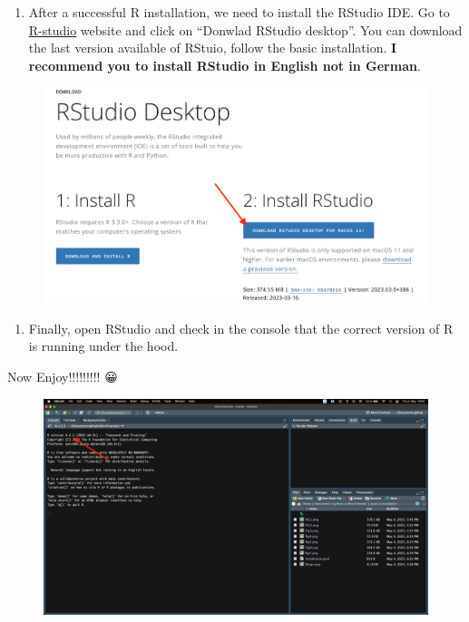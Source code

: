 \documentclass[
  letterpaper,
  DIV=11,
  numbers=noendperiod]{scrartcl}
\providecommand{\tightlist}{%
  \setlength{\itemsep}{0pt}\setlength{\parskip}{0pt}}\usepackage{longtable,booktabs,array}
\begin{document}
\begin{enumerate}
\def\labelenumi{\arabic{enumi}.}
\tightlist
\item
  After a successful R installation, we need to install the RStudio IDE.
  Go to \href{https://posit.co/download/rstudio-desktop/}{R-studio}
  website and click on ``Donwlad RStudio desktop''. You can download the
  last version available of RStuio, follow the basic installation.
  \textbf{I recommend you to install RStudio in English not in German}.
\end{enumerate}

\begin{figure}[H]

{\centering \includegraphics[width=6.77083in,height=\textheight]{fig7.png}

}

\end{figure}

\begin{enumerate}
\def\labelenumi{\arabic{enumi}.}
\setcounter{enumi}{1}
\tightlist
\item
  Finally, open RStudio and check in the console that the correct
  version of R is running under the hood.
\end{enumerate}

Now Enjoy!!!!!!!!! 😀

\begin{figure}[H]

{\centering \includegraphics[width=6.77083in,height=\textheight]{Fig8.png}

}

\end{figure}
\end{document}
